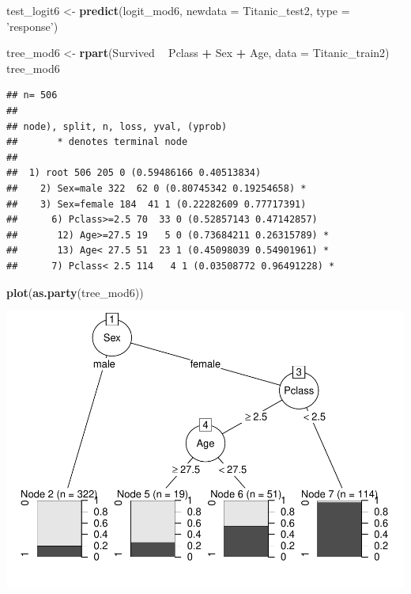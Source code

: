 \documentclass[]{article}
\newenvironment{Shaded}{\begin{snugshade}}{\end{snugshade}}
\newcommand{\KeywordTok}[1]{\textcolor[rgb]{0.13,0.29,0.53}{\textbf{#1}}}
\newcommand{\DataTypeTok}[1]{\textcolor[rgb]{0.13,0.29,0.53}{#1}}
\newcommand{\StringTok}[1]{\textcolor[rgb]{0.31,0.60,0.02}{#1}}
\newcommand{\OperatorTok}[1]{\textcolor[rgb]{0.81,0.36,0.00}{\textbf{#1}}}
\newcommand{\NormalTok}[1]{#1}
\begin{document}
\begin{Shaded}
\begin{Highlighting}[]
\NormalTok{test_logit6 <-}\StringTok{ }\KeywordTok{predict}\NormalTok{(logit_mod6, }\DataTypeTok{newdata =}\NormalTok{ Titanic_test2, }\DataTypeTok{type =} \StringTok{'response'}\NormalTok{)}

\NormalTok{tree_mod6 <-}\StringTok{ }\KeywordTok{rpart}\NormalTok{(Survived }\OperatorTok{~}\StringTok{ }\NormalTok{Pclass }\OperatorTok{+}\StringTok{ }\NormalTok{Sex }\OperatorTok{+}\StringTok{ }\NormalTok{Age, }\DataTypeTok{data =}\NormalTok{ Titanic_train2)}
\NormalTok{tree_mod6}
\end{Highlighting}
\end{Shaded}

\begin{verbatim}
## n= 506 
## 
## node), split, n, loss, yval, (yprob)
##       * denotes terminal node
## 
##  1) root 506 205 0 (0.59486166 0.40513834)  
##    2) Sex=male 322  62 0 (0.80745342 0.19254658) *
##    3) Sex=female 184  41 1 (0.22282609 0.77717391)  
##      6) Pclass>=2.5 70  33 0 (0.52857143 0.47142857)  
##       12) Age>=27.5 19   5 0 (0.73684211 0.26315789) *
##       13) Age< 27.5 51  23 1 (0.45098039 0.54901961) *
##      7) Pclass< 2.5 114   4 1 (0.03508772 0.96491228) *
\end{verbatim}

\begin{Shaded}
\begin{Highlighting}[]
\KeywordTok{plot}\NormalTok{(}\KeywordTok{as.party}\NormalTok{(tree_mod6))}
\end{Highlighting}
\end{Shaded}

\includegraphics{homework_8_Hee_Bryan_files/figure-latex/unnamed-chunk-4-1.pdf}
\end{document}
